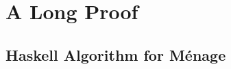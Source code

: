 \section{A Long Proof}
\label{app:long_proof}

\subsection{Haskell Algorithm for M\'enage}
\begin{singlespace}

\end{singlespace}

\Blindtext[1]

